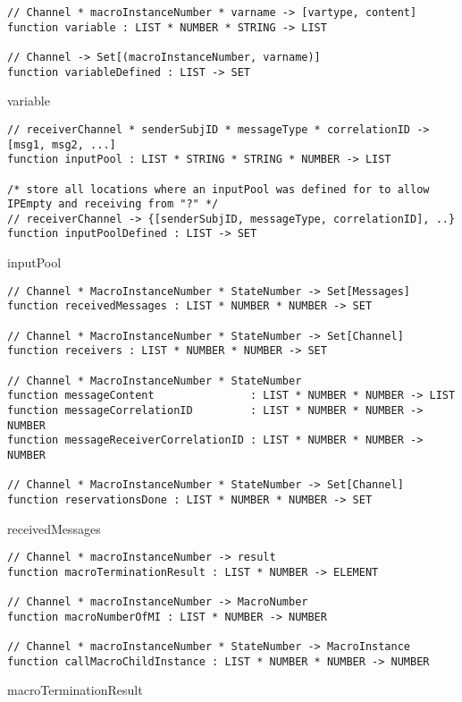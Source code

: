 \begin{listing}[H]
\begin{verbatim}
// Channel * macroInstanceNumber * varname -> [vartype, content]
function variable : LIST * NUMBER * STRING -> LIST

// Channel -> Set[(macroInstanceNumber, varname)]
function variableDefined : LIST -> SET
\end{verbatim}
\caption{variable}
\label{lst:asm:variable}
\end{listing}


\begin{listing}[H]
\begin{verbatim}
// receiverChannel * senderSubjID * messageType * correlationID -> [msg1, msg2, ...]
function inputPool : LIST * STRING * STRING * NUMBER -> LIST

/* store all locations where an inputPool was defined for to allow IPEmpty and receiving from "?" */
// receiverChannel -> {[senderSubjID, messageType, correlationID], ..}
function inputPoolDefined : LIST -> SET
\end{verbatim}
\caption{inputPool}
\label{lst:asm:inputPool}
\end{listing}



\begin{listing}[H]
\begin{verbatim}
// Channel * MacroInstanceNumber * StateNumber -> Set[Messages]
function receivedMessages : LIST * NUMBER * NUMBER -> SET

// Channel * MacroInstanceNumber * StateNumber -> Set[Channel]
function receivers : LIST * NUMBER * NUMBER -> SET

// Channel * MacroInstanceNumber * StateNumber
function messageContent               : LIST * NUMBER * NUMBER -> LIST
function messageCorrelationID         : LIST * NUMBER * NUMBER -> NUMBER
function messageReceiverCorrelationID : LIST * NUMBER * NUMBER -> NUMBER

// Channel * MacroInstanceNumber * StateNumber -> Set[Channel]
function reservationsDone : LIST * NUMBER * NUMBER -> SET
\end{verbatim}
\caption{receivedMessages}
\label{lst:asm:receivedMessages}
\end{listing}




\begin{listing}[H]
\begin{verbatim}
// Channel * macroInstanceNumber -> result
function macroTerminationResult : LIST * NUMBER -> ELEMENT

// Channel * macroInstanceNumber -> MacroNumber
function macroNumberOfMI : LIST * NUMBER -> NUMBER

// Channel * macroInstanceNumber * StateNumber -> MacroInstance
function callMacroChildInstance : LIST * NUMBER * NUMBER -> NUMBER
\end{verbatim}
\caption{macroTerminationResult}
\label{lst:asm:macroTerminationResult}
\end{listing}




